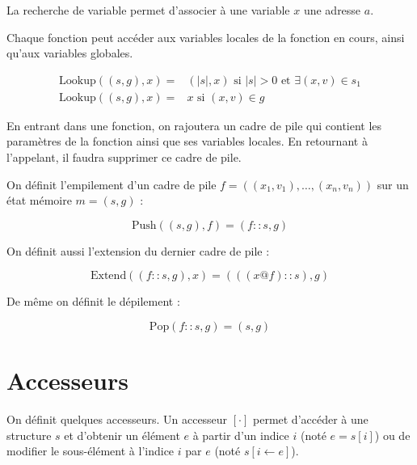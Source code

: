 \begin{definition}

  La recherche de variable permet d'associer à une variable $x$ une adresse $a$.

  Chaque fonction peut accéder aux variables locales de la fonction en cours,
  ainsi qu'aux variables globales.

  \begin{align*}
    \mathrm{Lookup} ((s, g), x) = & (|s|, x)
                                    \mbox{ si }|s| > 0
                                    \mbox{ et }∃ (x, v) ∈ s_1 \\
    \mathrm{Lookup} ((s, g), x) = & x \mbox{ si } (x, v) ∈ g
  \end{align*}

\end{definition}

En entrant dans une fonction, on rajoutera un cadre de pile qui contient les
paramètres de la fonction ainsi que ses variables locales. En retournant à
l'appelant, il faudra supprimer ce cadre de pile.

\begin{definition}

  On définit l'empilement d'un cadre de pile $f = ((x_1, v_1), …, (x_n, v_n))$
  sur un état mémoire $m = (s, g)$ :

  \[
    \mathrm{Push}((s, g), f) = (f::s, g)
  \]

  On définit aussi l'extension du dernier cadre de pile :

  \[
    \mathrm{Extend}((f::s, g), x) = (((x @ f) :: s), g)
  \]

  De même on définit le dépilement :

  \[
    \mathrm{Pop}(f::s, g) = (s, g)
  \]

\end{definition}

\section{Accesseurs}

On définit quelques accesseurs. Un accesseur $ [ \cdot ] $ permet d'accéder à
une structure $s$ et d'obtenir un élément $e$ à partir d'un indice $i$ (noté $e
= s [ i ]$) ou de modifier le sous-élément à l'indice $i$ par $e$ (noté $ s [ i
← e ] $).

